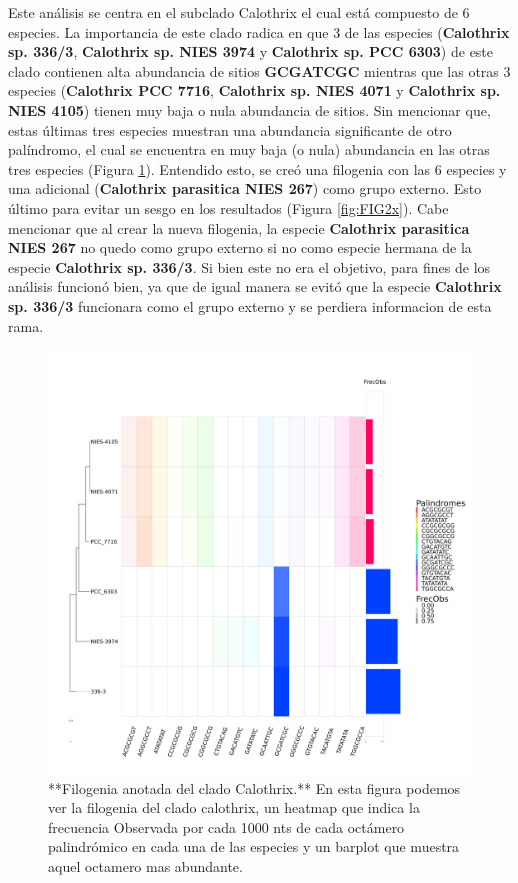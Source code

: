 \documentclass[
]{book}
\begin{document}
Este análisis se centra en el subclado Calothrix el cual está compuesto de 6 especies. La importancia de este clado radica en que 3 de las especies (\textbf{Calothrix sp. 336/3}, \textbf{Calothrix sp. NIES 3974} y \textbf{Calothrix sp. PCC 6303}) de este clado contienen alta abundancia de sitios \textbf{GCGATCGC} mientras que las otras 3 especies (\textbf{Calothrix PCC 7716}, \textbf{Calothrix sp. NIES 4071} y \textbf{Calothrix sp. NIES 4105}) tienen muy baja o nula abundancia de sitios. Sin mencionar que, estas últimas tres especies muestran una abundancia significante de otro palíndromo, el cual se encuentra en muy baja (o nula) abundancia en las otras tres especies (Figura \ref{fig:FIG1x}). Entendido esto, se creó una filogenia con las 6 especies y una adicional (\textbf{Calothrix parasitica NIES 267}) como grupo externo. Esto último para evitar un sesgo en los resultados (Figura \ref{fig:FIG2x}). Cabe mencionar que al crear la nueva filogenia, la especie \textbf{Calothrix parasitica NIES 267} no quedo como grupo externo si no como especie hermana de la especie \textbf{Calothrix sp. 336/3}. Si bien este no era el objetivo, para fines de los análisis funcionó bien, ya que de igual manera se evitó que la especie \textbf{Calothrix sp. 336/3} funcionara como el grupo externo y se perdiera informacion de esta rama.

\begin{figure}

{\centering \includegraphics[width=0.8\linewidth]{Clados/Callothrix_clade/figures/Calothrix_Octanuc_FrecObs_sel32_filogenia_HIG} 

}

\caption{**Filogenia anotada del clado Calothrix.** En esta figura podemos ver la filogenia del clado calothrix, un heatmap que indica la frecuencia Observada por cada 1000 nts de cada octámero palindrómico en cada una de las especies y un barplot que muestra aquel octamero mas abundante.}\label{fig:FIG1x}
\end{figure}
\end{document}
